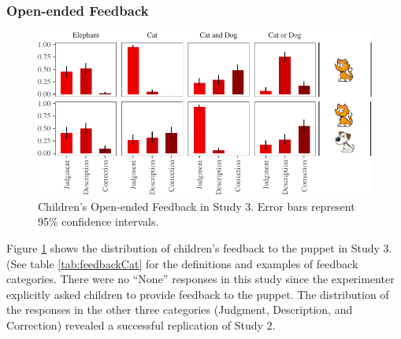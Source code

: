 \documentclass[oneside]{report}
\theoremstyle{definition}
\theoremstyle{definition}
\theoremstyle{definition}
\theoremstyle{remark}
\begin{document}
\subsubsection{Open-ended Feedback}\label{open-ended-feedback}
\begin{figure}[h]

{\centering \includegraphics{figs/feedbackStudy3-1} 

}

\caption{Children's Open-ended Feedback in Study 3. Error bars represent 95\% confidence intervals.}\label{fig:feedbackStudy3}
\end{figure}
Figure \ref{fig:feedbackStudy3} shows the distribution of children's
feedback to the puppet in Study 3. (See table \ref{tab:feedbackCat} for
the definitions and examples of feedback categories. There were no
``None'' responses in this study since the experimenter explicitly asked
children to provide feedback to the puppet. The distribution of the
responses in the other three categories (Judgment, Description, and
Correction) revealed a successful replication of Study 2.
\end{document}
